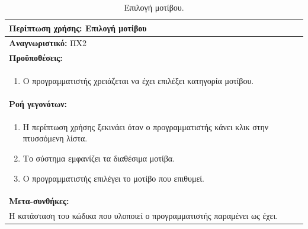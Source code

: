 \begin{table}[H]
	\hspace*{-0.2cm}
    \centering
    \scriptsize
	\begin{tabular}{|p{10cm}|}
	\hline
		\textbf{Περίπτωση χρήσης:} Επιλογή μοτίβου \\
	\hline
		\textbf{Αναγνωριστικό:} ΠΧ2 \\
	\hline	
		\textbf{Προϋποθέσεις:} \\
		\begin{enumerate}
		 \item Ο προγραμματιστής χρειάζεται να έχει επιλέξει κατηγορία μοτίβου.
		\end{enumerate}\\
	\hline
		\textbf{Ροή γεγονότων:} \\
		\begin{enumerate}
			\item Η περίπτωση χρήσης ξεκινάει όταν ο προγραμματιστής κάνει κλικ στην πτυσσόμενη λίστα.
			\item Το σύστημα εμφανίζει τα διαθέσιμα μοτίβα.
		 	\item Ο προγραμματιστής επιλέγει το μοτίβο που επιθυμεί.
		\end{enumerate}\\
	\hline
		\textbf{Μετα-συνθήκες:} \\ Η κατάσταση του κώδικα που υλοποιεί ο προγραμματιστής παραμένει ως έχει. \\
	\hline
    \end{tabular}
    \caption{Επιλογή μοτίβου.}
    \label{tab:selectPatternUC}
\end{table}
